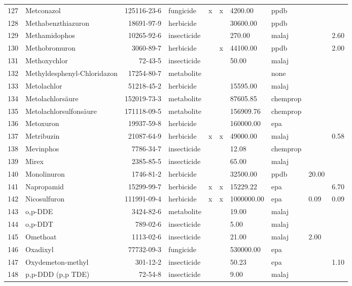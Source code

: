 \begin{longtable}{lp{3cm}rlp{0.5cm}p{0.5cm}p{1cm}p{1cm}p{1cm}p{1cm}}
  127 & Metconazol & 125116-23-6 & fungicide & x & x & 4200.00 & ppdb &  &  \\ 
  128 & Methabenzthiazuron & 18691-97-9 & herbicide &  &  & 30600.00 & ppdb &  &  \\ 
  129 & Methamidophos & 10265-92-6 & insecticide &  &  & 270.00 & malaj &  & 2.60 \\ 
  130 & Methobromuron & 3060-89-7 & herbicide &  & x & 44100.00 & ppdb &  & 2.00 \\ 
  131 & Methoxychlor & 72-43-5 & insecticide &  &  & 50.00 & malaj &  &  \\ 
  132 & Methyldesphenyl-Chloridazon & 17254-80-7 & metabolite &  &  &  & none &  &  \\ 
  133 & Metolachlor & 51218-45-2 & herbicide &  &  & 15595.00 & malaj &  &  \\ 
  134 & Metolachlorsäure & 152019-73-3 & metabolite &  &  & 87605.85 & chemprop &  &  \\ 
  135 & Metolachlorsulfonsäure & 171118-09-5 & metabolite &  &  & 156909.76 & chemprop &  &  \\ 
  136 & Metoxuron & 19937-59-8 & herbicide &  &  & 160000.00 & epa &  &  \\ 
  137 & Metribuzin & 21087-64-9 & herbicide & x & x & 49000.00 & malaj &  & 0.58 \\ 
  138 & Mevinphos & 7786-34-7 & insecticide &  &  & 12.08 & chemprop &  &  \\ 
  139 & Mirex & 2385-85-5 & insecticide &  &  & 65.00 & malaj &  &  \\ 
  140 & Monolinuron & 1746-81-2 & herbicide &  &  & 32500.00 & ppdb & 20.00 &  \\ 
  141 & Napropamid & 15299-99-7 & herbicide & x & x & 15229.22 & epa &  & 6.70 \\ 
  142 & Nicosulfuron & 111991-09-4 & herbicide & x & x & 1000000.00 & epa & 0.09 & 0.09 \\ 
  143 & o,p-DDE & 3424-82-6 & metabolite &  &  & 19.00 & malaj &  &  \\ 
  144 & o,p-DDT & 789-02-6 & insecticide &  &  & 5.00 & malaj &  &  \\ 
  145 & Omethoat & 1113-02-6 & insecticide &  &  & 21.00 & malaj & 2.00 &  \\ 
  146 & Oxadixyl & 77732-09-3 & fungicide &  &  & 530000.00 & epa &  &  \\ 
  147 & Oxydemeton-methyl & 301-12-2 & insecticide &  &  & 50.23 & epa &  & 1.10 \\ 
  148 & p,p-DDD (p,p TDE) & 72-54-8 & insecticide &  &  & 9.00 & malaj &  &  \\ 

\end{longtable}
